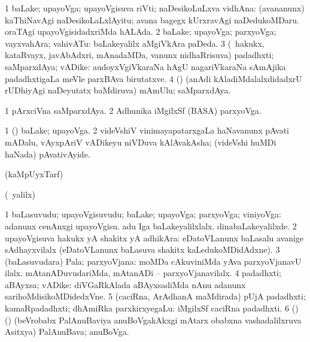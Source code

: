 \bentry
{}
\gl{\saMkiSx}
\expl{}
\bmng
{} 
\emng
\eentry

\bentry
{} 
\gl{\nA}
\expl{}
\bmng
\bnum
\num{1} baLake; upayoVga; upayoVgisuva riVti; naDesikoLuLxva vidhAna:  (avananunx) kaThiNavAgi naDesikoLaLxlAyitu; avana bagegx kUrxravAgi naDedukoMDaru.  oraTAgi upayoVgisidadxriMda hALAda. 
\num{2} baLake; upayoVga; parxyoVga; vayxvahAra; vahivATu:  baLakeyalilx aMgiVkAra paDeda. 
\num{3} (\kanmu\ hakukx, kataRvayx, javAbAdxri, mAnadaMDa, \mo vanunx nidhaRrisuva) padadhxti; saMparxdAya; vADike:  audoyxVgiVkaraNa hAgU nagariVkaraNa sAmAjika padadhxtigaLa meVle parxBAva birutatxve. 
\num{4} (\nAyxshA) (anAdi kAladiMdalalxdidadxrU rUDhiyAgi naDeyutatx baMdiruva) mAmUlu; saMparxdAya. 
\enum
\emng

\noindent
\gl{\pagu}
\expl{}
\bmng
\bnum
\num{1}  pArxciVna saMparxdAya. 
\num{2}  Adhunika iMgilxSf (BASA) parxyoVga. 
\enum
\emng
\eentry

\bentry
{} 
\gl{\nA}
\bmng
\bnum
\num{1} (\pArxparx) baLake; upayoVga. 
\num{2} videVshiV vinimayapatarxgaLa haNavanunx pAvati mADalu, vAyxpAriV vADikeyu niVDuva kAlAvakAsha; (videVshi huMDi haNada) pAvativAyide. 
\enum
\emng
\eentry

\bentry
{}
\gl{\saMkiSx}
\expl{}
\bmng
(kaMpUyxTarf)  
\emng
\eentry

\bentry
{}
\gl{\saMkiSx}
\expl{}
\bmng
{} 
\emng
\eentry

\bentry
{}
\gl{\saMkiSx}
\expl{}
\bmng
(\UK\ yalilx)  
\emng
\eentry

\bentry
{} 
\gl{\nA}
\expl{}
\bmng
\bnum
\num{1} baLasuvudu; upayoVgisuvudu; baLake; upayoVga; parxyoVga; viniyoVga:  adanunx cenAnxgi upayoVgisu.  adu Iga baLakeyalilxlalx.  dinabaLakeyalilxde. 
\num{2} upayoVgisuva hakukx yA shakitx yA adhikAra:  eDatoVLanunx baLasalu avanige sAdhayxvilalx (eDatoVLanunx baLasuva shakitx kaLedukoMDidAdxne). 
\num{3} (baLasuvudara) Pala; parxyoVjana:  moMDa cAkuviniMda yAva parxyoVjanavU ilalx.  mAtanADuvudariMda, mAtanADi -- parxyoVjanavilalx. 
\num{4} padadhxti; aBAyxsa; vADike:  diVGaRkAlada aBAyxsadiMda nAnu adanunx sarihoMdisikoMDidedxVne. 
\num{5} (caciRna, ArAdhanA maMdirada) pUjA padadhxti; kamaRpadadhxti; dhAmiRka parxkirxyegaLu:  iMgilxSf caciRna padadhxti. 
\num{6} (\nAyxshA) (\ca) (beVrobabx PalAnuBaviya anuBoVgakAkxgi mAtarx obabxna vashadalilxruva Asitxya) PalAnuBava; anuBoVga. 
\enum
\emng


